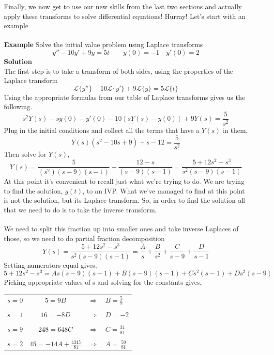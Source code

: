 \documentclass[10pt,reqno]{book}
\theoremstyle{definition}
\def\L{\mathscr{L}}
\begin{document}
	Finally, we now get to use our new skills from the last two sections and actually apply these transforms to solve differential equations! Hurray! Let's start with an example\\ \\
	\textbf{Example} Solve the initial value problem using Laplace transforms
	\[ y'' - 10y' + 9y = 5t \qquad y(0) = -1  \quad y'(0) = 2\]
	\textbf{Solution}\\
	The first step is to take a transform of both sides, using the properties of the Laplace transform
	\[ \L\{y''\} - 10\L\{y'\} + 9\L\{y\} = 5\L\{t\} \]
	Using the appropriate formulas from our table of Laplace transforms gives us the following.
	\[ s^2 Y(s) - sy(0) - y'(0) - 10(sY(s) - y(0)) + 9Y(s) = \frac{5}{s^2} \]
	Plug in the initial conditions and collect all the terms that have a $ Y(s) $ in them.
	\[ Y(s)(s^2 - 10s + 9) + s -12 = \frac{5}{s^2} \]
	Then solve for $ Y(s) $,
	\[ Y(s) = \frac{5}{(s^2)(s-9)(s-1)} + \frac{12 - s}{(s-9)(s-1)} = \frac{5 + 12s^2 - s^3}{s^2(s-9)(s-1)} \]
	At this point it's convenient to recall just what we're trying to do. We are trying to find the solution, $ y(t) $, to an IVP. What we've managed to find at this point is not the solution, but its Laplace transform. So, in order to find the solution all that we need to do is to take the inverse transform.\\ \\
	We need to split this fraction up into smaller ones and take inverse Laplaces of those, so we need to do partial fraction decomposition
	\[ Y(s) = \frac{5 + 12s^2 - s^3}{s^2(s-9)(s-1)} = \frac{A}{s} + \frac{B}{s^2} + \frac{C}{s-9} + \frac{D}{s-1} \]
	Setting numerators equal gives,
	\[ 5 + 12s^2 - s^3 = As(s-9)(s-1) + B(s-9)(s-1) + Cs^2(s-1) + Ds^2(s-9) \]
	Picking appropriate values of s and solving for the constants gives,
	\begin{center}
		\begin{tabular}{lcll}
			$ s = 0 $ & $ 5 = 9B $  & $ \Rightarrow $ & $ \displaystyle{B = \frac{5}{9}} $ \\ \\
			$ s = 1 $ & $ 16 = -8D $ & $ \Rightarrow $ & $ \displaystyle{D = -2} $  \\ \\
			$ s = 9 $   & $ 248 = 648C $ & $ \Rightarrow $ & $ \displaystyle{C = \frac{31}{81}}$ \\ \\
			$ s = 2 $ & $ 45 = -14A + \displaystyle{\frac{4345}{81}} $ & $ \Rightarrow $ & $ \displaystyle{A =\, \frac{50}{81}} $
		\end{tabular}
	\end{center}
\end{document}
